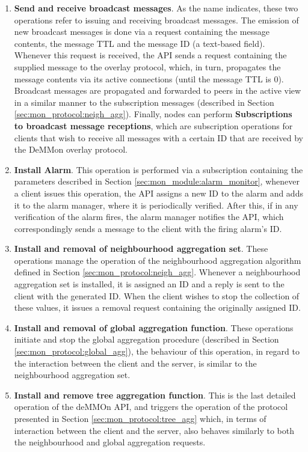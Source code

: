 \begin{enumerate}
    \item \textbf{Send and receive broadcast messages}. As the name indicates, these two operations refer to issuing and receiving broadcast messages. The emission of new broadcast messages is done via a request containing the message contents, the message TTL and the message ID (a text-based field). Whenever this request is received, the API sends a request containing the supplied message to the overlay protocol, which, in turn, propagates the message contents via its active connections (until the message TTL is 0). Broadcast messages are propagated and forwarded to peers in the active view in a similar manner to the subscription messages (described in Section \ref{sec:mon_protocol:neigh_agg}). Finally, nodes can perform \textbf{Subscriptions to broadcast message receptions}, which are subscription operations for clients that wish to receive all messages with a certain ID that are received by the DeMMon overlay protocol. 
    
    \item \textbf{Install Alarm}. This operation is performed via a subscription containing the parameters described in Section \ref{sec:mon_module:alarm_monitor}, whenever a client issues this operation, the API assigns a new ID to the alarm and adds it to the alarm manager, where it is periodically verified. After this, if in any verification of the alarm fires, the alarm manager notifies the API, which correspondingly sends a message to the client with the firing alarm's ID.

    \item \textbf{Install and removal of neighbourhood aggregation set}. These operations manage the operation of the neighbourhood aggregation algorithm defined in Section \ref{sec:mon_protocol:neigh_agg}. Whenever a neighbourhood aggregation set is installed, it is assigned an ID and a reply is sent to the client with the generated ID. When the client wishes to stop the collection of these values, it issues a removal request containing the originally assigned ID.

    \item \textbf{Install and removal of global aggregation function}. These operations initiate and stop the global aggregation procedure (described in Section \ref{sec:mon_protocol:global_agg}), the behaviour of this operation, in regard to the interaction between the client and the server, is similar to the neighbourhood aggregation set. 
    
    \item \textbf{Install and remove tree aggregation function}. This is the last detailed operation of the deMMOn API, and triggers the operation of the protocol presented in Section \ref{sec:mon_protocol:tree_agg} which, in terms of interaction between the client and the server, also behaves similarly to both the neighbourhood and global aggregation requests.
    
\end{enumerate}

